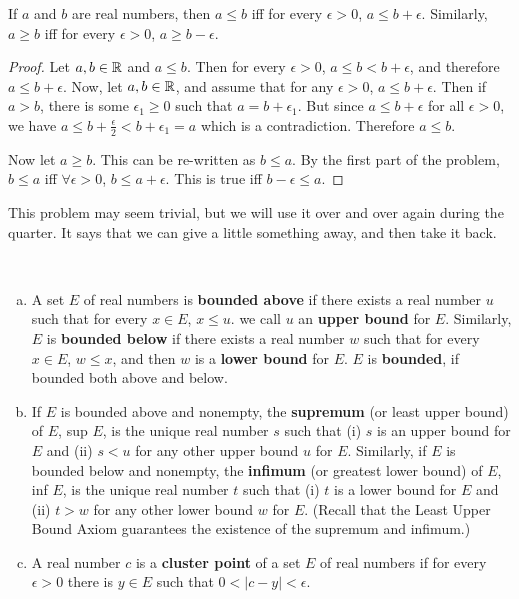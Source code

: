 \begin{pblm}%
	If $a$ and $b$ are real numbers, then $a \le b$ iff for every $\epsilon > 0$, 
	$a \le b + \epsilon$. Similarly, $a \ge b$ iff for every $\epsilon > 0$, 
	$a \ge b - \epsilon$. 
\begin{proof}
	Let $a, b \in \mathbb{R}$ and $a \le b$. Then for every $\epsilon > 0$, 
	$a \le b < b + \epsilon$, and therefore $a \le b + \epsilon$. 
	Now, let $a, b \in \mathbb{R}$, and assume that for any 
	$\epsilon > 0$, $a \le b + \epsilon$. Then if $a > b$, there is some 
	$\epsilon_1 \ge 0$ such that $a = b + \epsilon_1$. But since $a \le b + \epsilon$ for 
	all $\epsilon > 0$, we have 
	$a \le b + \frac{\epsilon}{2} < b + \epsilon_1 = a $ 
	which is a contradiction. Therefore $a \le b$. 

	Now let $a \ge b$. This can be re-written as $b \le a$. By 
	the first part of the problem, $b \le a$ iff $\forall \epsilon > 0$, 
	$b \le a + \epsilon$. This is true iff $b - \epsilon \le a$. 
\end{proof}
\end{pblm}

\begin{rmk}%
	This problem may seem trivial, but we will use it over and over again during the quarter. 
	It says that we can give a little something away, and then take it back. 
\end{rmk}

\begin{defn}\label{d:boundedset}%
~
	\begin{enumerate}[(a)]
		\item A set $E$ of real numbers is \textbf{bounded above} if there 
		exists a real number $u$ such that for every $x \in E$, $x \le u$. 
		we call $u$ an \textbf{upper bound} for $E$. Similarly, $E$ is 
		\textbf{bounded below} if there exists a real number $w$ such that 
		for every $x \in E$, $w \le x$, and then $w$ is a \textbf{lower bound} 
		for $E$. $E$ is \textbf{bounded}, if bounded both above and below. 
		\item If $E$ is bounded above and nonempty, the \textbf{supremum} 
		(or least upper bound) of $E$, sup $E$, is the unique real number $s$ 
		such that (i) $s$ is an upper bound for $E$ and (ii) $s < u$ for any 
		other upper bound $u$ for $E$. Similarly, if $E$ is bounded below 
		and nonempty, the \textbf{infimum} (or greatest lower bound) of $E$, 
		inf $E$, is the unique real number $t$ such that (i) $t$ is a lower 
		bound for $E$ and (ii) $t > w$ for any other lower bound $w$ for $E$. 
		(Recall that the Least Upper Bound Axiom guarantees the existence of 
		the supremum and infimum.) 
		\item A real number $c$ is a \textbf{cluster point} of a set $E$ of 
		real numbers if for every $\epsilon > 0$ there is $y \in E$ such that 
		$0 < |c - y| < \epsilon$. 
	\end{enumerate}
\end{defn}

